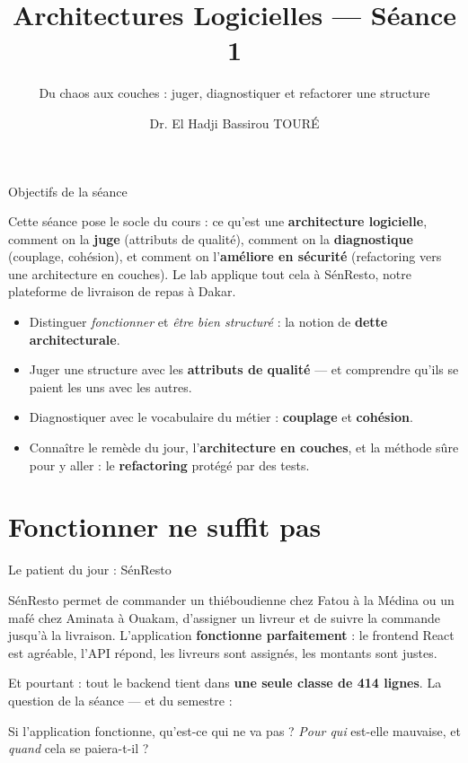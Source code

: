 \documentclass[aspectratio=169,11pt]{beamer}
\title{Architectures Logicielles — Séance 1}
\subtitle{Du chaos aux couches : juger, diagnostiquer et refactorer une structure}
\author{Dr. El Hadji Bassirou TOURÉ}
\institute{Département de Mathématiques et Informatique\\ Faculté des Sciences et Techniques\\ Université Cheikh Anta Diop de Dakar}
\date{}
\begin{document}
\begin{frame}\titlepage\end{frame}

\begin{frame}{Objectifs de la séance}
\begin{ucaddef}[Contenu]
{\small Cette séance pose le socle du cours : ce qu'est une \textbf{architecture logicielle}, comment on la \textbf{juge} (attributs de qualité), comment on la \textbf{diagnostique} (couplage, cohésion), et comment on l'\textbf{améliore en sécurité} (refactoring vers une architecture en couches). Le lab applique tout cela à SénResto, notre plateforme de livraison de repas à Dakar.}
\end{ucaddef}
\begin{itemize}\small
  \item Distinguer \emph{fonctionner} et \emph{être bien structuré} : la notion de \textbf{dette architecturale}.
  \item Juger une structure avec les \textbf{attributs de qualité} — et comprendre qu'ils se paient les uns avec les autres.
  \item Diagnostiquer avec le vocabulaire du métier : \textbf{couplage} et \textbf{cohésion}.
  \item Connaître le remède du jour, l'\textbf{architecture en couches}, et la méthode sûre pour y aller : le \textbf{refactoring} protégé par des tests.
\end{itemize}
\end{frame}

\section{Fonctionner ne suffit pas}

\begin{frame}{Le patient du jour : SénResto}
\begin{ucaddef}[La situation]
{\small SénResto permet de commander un thiéboudienne chez Fatou à la Médina ou un mafé chez Aminata à Ouakam, d'assigner un livreur et de suivre la commande jusqu'à la livraison. L'application \textbf{fonctionne parfaitement} : le frontend React est agréable, l'API répond, les livreurs sont assignés, les montants sont justes.}
\end{ucaddef}
\vskip2pt
{\small Et pourtant : tout le backend tient dans \textbf{une seule classe de 414 lignes}. La question de la séance --- et du semestre :}
\begin{ucadpiege}
{\small Si l'application fonctionne, qu'est-ce qui ne va pas ? \emph{Pour qui} est-elle mauvaise, et \emph{quand} cela se paiera-t-il ?}
\end{ucadpiege}
\end{frame}
\end{document}
